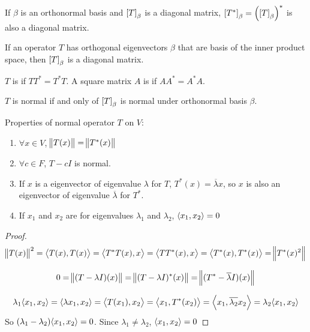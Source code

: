 \begin{theorem}
    If $\beta$ is an orthonormal basis and $\coordinate{T}_\beta$ is a diagonal matrix, $\coordinate{T^*}_\beta = \mleft(\coordinate{T}_\beta\mright)^*$ is also a diagonal matrix.
\end{theorem}

\begin{theorem}
    If an operator $T$ has orthogonal eigenvectors $\beta$ that are basis of the inner product space, then $\coordinate{T}_\beta$ is a diagonal matrix.
\end{theorem}




\begin{definition}
    $T$ is  if $T T^* = T^* T$. A square matrix $A$ is  if $AA^* = A^* A$.
\end{definition}

\begin{theorem}
    $T$ is normal if and only of $\coordinate{T}_\beta$ is normal under orthonormal basis $\beta$.
\end{theorem}

\begin{theorem}\label{propertyofnormaloperator}
    Properties of normal operator $T$ on $V$:
    \begin{enumerate}
        \item $\forall x \in V$, $\norm{T(x)} = \norm{T^*(x)}$
        \item $\forall c \in F$, $T - cI$ is normal.
        \item If $x$ is a eigenvector of eigenvalue $\lambda$ for $T$, $T^*(x) = \overline{\lambda} x$, so $x$ is also an eigenvector of eigenvalue $\overline{\lambda}$ for $T^*$.
        \item If $x_1$ and $x_2$ are for eigenvalues $\lambda_1$ and $\lambda_2$, $\innerproduct{x_1}{x_2} = 0$
    \end{enumerate}    
\end{theorem}
\begin{proof}
    \begin{equation*}
        \norm{T(x)}^2 = \innerproduct{T(x)}{T(x)} = \innerproduct{T^* T (x)}{x} = \innerproduct{TT^*(x)}{x} = \innerproduct{T^*(x)}{T^*(x)} = \norm{T^*(x)^2}
    \end{equation*}
    
    \begin{equation*}
        0 = \norm{(T - \lambda I)(x)} = \norm{(T - \lambda I)^*(x)} = \norm{(T^* - \overline{\lambda} I)(x) }
    \end{equation*}
    
    \begin{equation*}
        \lambda_1 \innerproduct{x_1}{x_2} = \innerproduct{\lambda x_1}{x_2} = \innerproduct{T(x_1)}{x_2} = \innerproduct{x_1}{T^*(x_2)} = \innerproduct{x_1}{\overline{\lambda_2} x_2} = \lambda_2 \innerproduct{x_1}{x_2}
    \end{equation*}
    So $(\lambda_1 - \lambda_2) \innerproduct{x_1}{x_2} = 0$. Since $\lambda_1 \neq \lambda_2$, $\innerproduct{x_1}{x_2} = 0$
\end{proof}



